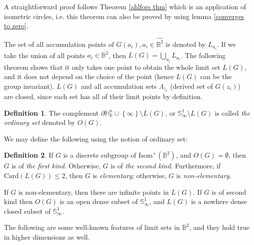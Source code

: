 \documentclass[12pt,oneside]{sfsuthesis}
\theoremstyle{plain} %
\theoremstyle{definition}  %
\newtheorem{definition}{Definition}[chapter]
\theoremstyle{remark}  %
\theoremstyle{plain}
\begin{document}
{A straightforward proof\cite[p.79]{ahlfors1981mobius} follows Theorem \ref{ahlfors thm} which is an application of isometric circles, i.e. this theorem can also be proved by using lemma \ref{converges to zero}. 

The set of all accumulation points of $G(a_i), a_i\in \widehat{\mathbb{B}^2}$ is denoted by $L_{a_i}$. If we take the union of all points $a_i\in \overline{\mathbb{B}^2}$, then $L(G)=\bigcup_{a_i} L_{a_i}$. The following theorem shows that it only takes one point to obtain the whole limit set $L(G)$, and it does not depend on the choice of the point (hence $L(G)$ can be the group invariant). $L(G)$ and all accumulation sets $\Lambda_{z_i}$ (derived set of $G(z_i)$) are closed, since each set has all of their limit points by definition. 
\begin{definition}
The complement $\partial \mathbb{H}^n_\mathbb{R} \cup\left\lbrace \infty \right\rbrace\setminus L(G)$, or $\mathbb{S}^{1}_\infty\setminus L(G)$ is called \textit{the ordinary set} denoted by $O(G)$. 
\end{definition}

We may define the following using the notion of ordinary set:
\begin{definition}
If $G$ is a discrete subgroup of $\text{Isom}^+(\mathbb{B}^2)$, and $O(G)=\emptyset$, then $G$ is of \textit{the first kind}. Otherwise, $G$ is of \textit{the second kind}. Furthermore, if $\text{Card}(L(G))\leq 2$, then $G$ is \textit{elementary}; otherwise, $G$ is \textit{non-elementary}.
\end{definition}

If $G$ is non-elementary, then there are infinite points in $L(G)$. If $G$ is of second kind then $O(G)$ is an open dense subset of $\mathbb{S}^{1}_\infty$, and $L(G)$ is a nowhere dense closed subset of $\mathbb{S}^{1}_\infty$\cite[Theorem 12.2.7]{ratcliffe1994foundations}.

The following are some well-known features of limit sets in $\mathbb{B}^2$, and they hold true in higher dimensions as well.

}
\end{document}
